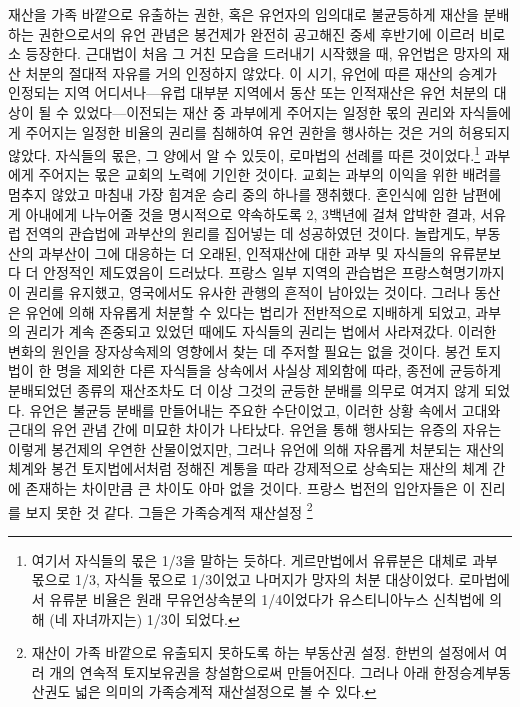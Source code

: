 재산을 가족 바깥으로 유출하는 권한,
혹은
유언자의 임의대로
불균등하게 재산을 분배하는 권한으로서의 유언 관념은
봉건제가 완전히 공고해진 중세 후반기에 이르러 비로소 등장한다.
근대법이 처음 그 거친 모습을 드러내기 시작했을 때,
유언법은 망자의 재산 처분의 절대적 자유를 거의 인정하지 않았다.
이 시기, 유언에 따른 재산의 승계가 인정되는 지역 어디서나---유럽
대부분 지역에서 동산 또는 인적재산은 유언 처분의 대상이 될 수
있었다---이전되는 재산 중 과부에게 주어지는 일정한 몫의 권리와
자식들에게 주어지는 일정한 비율의 권리를
침해하여 유언 권한을 행사하는 것은 거의 허용되지 않았다.
자식들의 몫은, 그 양에서 알 수 있듯이,
로마법의 선례를 따른 것이었다.\footnote{%
  여기서 자식들의 몫은 1/3을 말하는 듯하다.
  게르만법에서 유류분은 대체로
  과부 몫으로 1/3, 자식들 몫으로 1/3이었고 나머지가
  망자의 처분 대상이었다.
  로마법에서 유류분 비율은 원래 무유언상속분의 1/4이었다가
  유스티니아누스 신칙법에 의해 (네 자녀까지는) 1/3이 되었다.
}
과부에게 주어지는 몫은 교회의 노력에 기인한 것이다.
교회는 과부의 이익을 위한 배려를 멈추지 않았고
마침내 가장 힘겨운 승리 중의 하나를 쟁취했다.
혼인식에 임한
남편에게
아내에게 나누어줄 것을 명시적으로 약속하도록
2, 3백년에 걸쳐
압박한 결과,
서유럽 전역의 관습법에 과부산의 원리를
집어넣는 데 성공하였던 것이다.
놀랍게도, 부동산의 과부산이
그에 대응하는 더 오래된,
인적재산에 대한 과부 및 자식들의 유류분보다
더 안정적인 제도였음이 드러났다.
프랑스 일부 지역의 관습법은 프랑스혁명기까지 이 권리를 유지했고,
영국에서도 유사한 관행의 흔적이 남아있는 것이다.
그러나
동산은 유언에 의해 자유롭게 처분할 수 있다는 법리가
전반적으로 지배하게 되었고,
과부의 권리가 계속 존중되고 있었던 때에도
자식들의 권리는 법에서 사라져갔다.
이러한 변화의 원인을 장자상속제의 영향에서
찾는 데 주저할 필요는 없을 것이다.
봉건 토지법이 한 명을 제외한 다른 자식들을 상속에서 사실상 제외함에 따라,
종전에 균등하게 분배되었던 종류의 재산조차도
더 이상 그것의 균등한 분배를 의무로 여겨지 않게 되었다.
유언은 불균등 분배를 만들어내는 주요한 수단이었고,
이러한 상황 속에서
고대와 근대의 유언 관념 간에 미묘한 차이가 나타났다.
유언을 통해 행사되는 유증의 자유는 이렇게 봉건제의 우연한 산물이었지만,
그러나
유언에 의해 자유롭게 처분되는 재산의 체계와
봉건 토지법에서처럼
정해진 계통을 따라 강제적으로 상속되는 재산의 체계
간에 존재하는 차이만큼 큰 차이도 아마 없을 것이다.
프랑스 법전의 입안자들은 이 진리를 보지 못한 것 같다.
그들은
가족승계적 재산설정%
\footnote{재산이 가족 바깥으로 유출되지 못하도록 하는 부동산권 설정.
  한번의 설정에서 여러 개의 연속적 토지보유권을 창설함으로써 만들어진다.
  그러나 아래 한정승계부동산권도 넓은 의미의 가족승계적 재산설정으로 볼 수 있다.
}%
